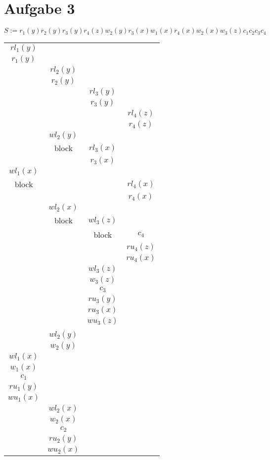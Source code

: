 \documentclass{scrartcl}
\begin{document}
\section*{Aufgabe 3}

$S := r_1(y)r_2(y)r_3(y)r_4(z)w_2(y)r_3(x)w_1(x)r_4(x)w_2(x)w_3(z)c_1c_2c_3c_4$\\
\begin{tabular}{|c|c|c|c|}
\hline
 $rl_1(y)$ &  &  &  \\ 
 $r_1(y)$ &  &  &  \\ 
  & $rl_2(y)$ &  &  \\ 
  & $r_2(y)$ &  &  \\ 
  &  & $rl_3(y)$ &  \\ 
  &  & $r_3(y)$ &  \\ 
  &  &  & $rl_4(z)$ \\ 
  &  &  & $r_4(z)$ \\ 
  & $wl_2(y)$ &  &  \\ 
  & block & $rl_3(x)$ &  \\ 
  &  & $r_3(x)$ &  \\ 
 $wl_1(x)$ &  &  &  \\ 
 block &  &  & $rl_4(x)$ \\ 
  &  &  & $r_4(x)$ \\ 
  & $wl_2(x)$ &  &  \\ 
  & block & $wl_3(z)$ &  \\
  &  & block & $c_4$ \\ 
  &  &  & $ru_4(z)$ \\ 
  &  &  & $ru_4(x)$ \\ 
  &  & $wl_3(z)$ &  \\
  &  & $w_3(z)$ &  \\
  &  & $c_3$ &  \\
  &  & $ru_3(y)$ &  \\
  &  & $ru_3(x)$ &  \\
  &  & $wu_3(z)$ &  \\
  &  &  &  \\
  & $wl_2(y)$ &  &  \\
  & $w_2(y)$ &  &  \\
 $wl_1(x)$ &  &  &  \\
 $w_1(x)$ &  &  &  \\
 $c_1$ &  &  &  \\
 $ru_1(y)$ &  &  &  \\
 $wu_1(x)$ &  &  &  \\
  & $wl_2(x)$ &  &  \\
  & $w_2(x)$ &  &  \\
  & $c_2$ &  &  \\
  & $ru_2(y)$ &  &  \\
  & $wu_2(x)$ &  &  \\
 \hline
\end{tabular} 
\end{document}
